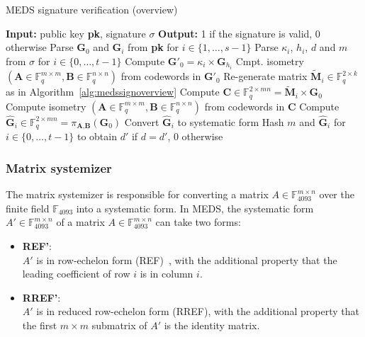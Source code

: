 \documentclass[11pt,a4paper]{report}
\theoremstyle{definition}
\begin{document}
\begin{algorithm}
  \caption{MEDS signature verification (overview)}
  \label{alg:medsverifyoverview}
  \begin{algorithmic}[1]
    \State \textbf{Input:} public key \textbf{pk}, signature $\sigma$
    \State \textbf{Output:} 1 if the signature is valid, 0 otherwise
    \State Parse $\textbf{G}_0$ and $\textbf{G}_i$ from \textbf{pk} for $i \in \{1, \ldots, s - 1\}$
    \State Parse $\kappa_i$, $h_i$, $d$ and $m$ from $\sigma$ for $i \in \{0, \ldots, t - 1\}$
    \State Compute $\textbf{G}'_{0} = \kappa_i \times \textbf{G}_{h_i}$
    \State Cmpt. isometry $(\textbf{A} \in \mathbb{F}_q^{m \times m}, \textbf{B} \in \mathbb{F}_q^{n \times n})$ from codewords in $\textbf{G}'_{0}$
    \Else
    \State Re-generate matrix $\tilde{\textbf{M}}_i \in \mathbb{F}_q^{2 \times k}$ as in Algorithm~\ref{alg:medssignoverview}
    \State Compute $\textbf{C} \in \mathbb{F}_q^{2 \times mn} = \tilde{\textbf{M}}_i \times \textbf{G}_0$
    \State Compute isometry $(\textbf{A} \in \mathbb{F}_q^{m \times m}, \textbf{B} \in \mathbb{F}_q^{n \times n})$ from codewords in $\textbf{C}$
    \EndIf
    \State Compute $\hat{\textbf{G}}_i \in \mathbb{F}_q^{2 \times mn} = \pi_{\textbf{A}, \textbf{B}}(\textbf{G}_0)$
    \State Convert $\hat{\textbf{G}}_i$ to systematic form
    \EndFor
    \State Hash $m$ and $\hat{\textbf{G}}_i$ for $i \in \{0, \ldots, t - 1\}$ to obtain $d'$
    \State {} if $d = d'$, 0 otherwise
  \end{algorithmic}
\end{algorithm}

\subsubsection{Matrix systemizer}
\label{sec:systemizer}
The matrix systemizer is responsible for converting a matrix $A \in \mathbb{F}_{4093}^{m \times n}$ over the finite field $\mathbb{F}_{4093}$ into a systematic form. In MEDS, the systematic form $A' \in \mathbb{F}_{4093}^{m \times n}$ of a matrix $A \in \mathbb{F}_{4093}^{m \times n}$ can take two forms:
\begin{itemize}
  \item \textbf{REF'}:\\
        $A'$ is in row-echelon form (REF)~\cite[Section 3.2]{van1998introduction}, with the additional property that the leading coefficient of row $i$ is in column $i$.
  \item \textbf{RREF'}:\\
        $A'$ is in reduced row-echelon form (RREF), with the additional property that the first $m \times m$ submatrix of $A'$ is the identity matrix.
\end{itemize}
\end{document}
